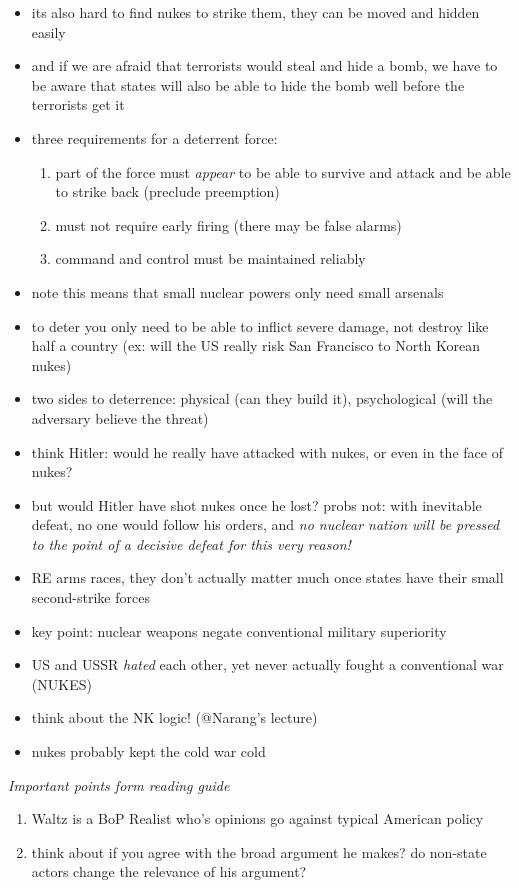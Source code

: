 \documentclass{article}
\begin{document}
\begin{itemize}
    \item its also hard to find nukes to strike them, they can be moved and hidden easily
    \item and if we are afraid that terrorists would steal and hide a bomb, we have to be aware that states will also be able to hide the bomb well before the terrorists get it
    \item three requirements for a deterrent force:
    \begin{enumerate}
        \item part of the force must \textit{appear} to be able to survive and attack and be able to strike back (preclude preemption)
        \item must not require early firing (there may be false alarms)
        \item command and control must be maintained reliably
    \end{enumerate}
    \item note this means that small nuclear powers only need small arsenals
    \item to deter you only need to be able to inflict severe damage, not destroy like half a country (ex: will the US really risk San Francisco to North Korean nukes)
    \item two sides to deterrence: physical (can they build it), psychological (will the adversary believe the threat)
    \item think Hitler: would he really have attacked with nukes, or even in the face of nukes?
    \item but would Hitler have shot nukes once he lost? probs not: with inevitable defeat, no one would follow his orders, and \textit{no nuclear nation will be pressed to the point of a decisive defeat for this very reason!}
    \item RE arms races, they don't actually matter much once states have their small second-strike forces
    \item key point: nuclear weapons negate conventional military superiority
    \item US and USSR \textit{hated} each other, yet never actually fought a conventional war (NUKES)
    \item think about the NK logic! (@Narang's lecture)
    \item nukes probably kept the cold war cold
\end{itemize}
\textit{Important points form reading guide}
\begin{enumerate}
    \item Waltz is a BoP Realist who's opinions go against typical American policy
    \item think about if you agree with the broad argument he makes? do non-state actors change the relevance of his argument?
\end{enumerate}
\end{document}

